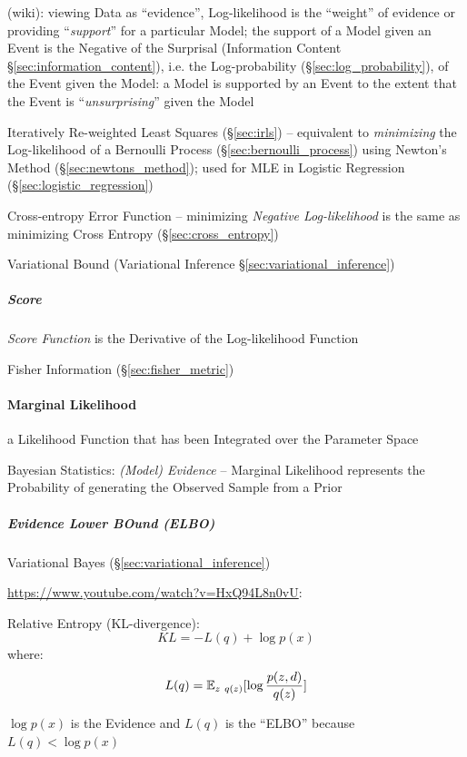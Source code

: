 (wiki): viewing Data as ``evidence'', Log-likelihood is the ``weight'' of
evidence or providing ``\emph{support}'' for a particular Model; the support of
a Model given an Event is the Negative of the Surprisal (Information Content
\S\ref{sec:information_content}), i.e. the Log-probability
(\S\ref{sec:log_probability}), of the Event given the Model: a Model is
supported by an Event to the extent that the Event is ``\emph{unsurprising}''
given the Model

Iteratively Re-weighted Least Squares (\S\ref{sec:irls}) -- equivalent to
\emph{minimizing} the Log-likelihood of a Bernoulli Process
(\S\ref{sec:bernoulli_process}) using Newton's Method
(\S\ref{sec:newtons_method}); used for MLE in Logistic Regression
(\S\ref{sec:logistic_regression})

\fist Cross-entropy Error Function -- minimizing \emph{Negative Log-likelihood}
is the same as minimizing Cross Entropy (\S\ref{sec:cross_entropy})

Variational Bound (Variational Inference \S\ref{sec:variational_inference})



\subparagraph{Score}\label{sec:score}\hfill

\emph{Score Function} is the Derivative of the Log-likelihood Function

\fist Fisher Information (\S\ref{sec:fisher_metric})



\paragraph{Marginal Likelihood}\label{sec:marginal_likelihood}\hfill

a Likelihood Function that has been Integrated over the Parameter Space

Bayesian Statistics: \emph{(Model) Evidence} -- Marginal Likelihood represents
the Probability of generating the Observed Sample from a Prior



\subparagraph{Evidence Lower BOund (ELBO)}\label{sec:elbo}\hfill

Variational Bayes (\S\ref{sec:variational_inference})

\url{https://www.youtube.com/watch?v=HxQ94L8n0vU}:

Relative Entropy (KL-divergence):
\[
  KL = - L(q) + \log p(x)
\]
where:
\[
  L(q) = \mathbb{E}_{z ~ q(z)}[\log \frac{p(z,d)}{q(z)}]
\]

$\log p(x)$ is the Evidence and $L(q)$ is the ``ELBO'' because
$L(q) < \log p(x)$




